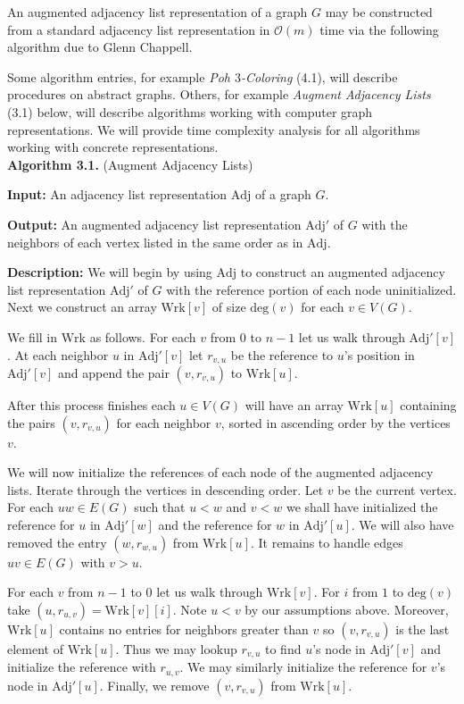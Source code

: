 \documentclass[letterpaper, 12pt]{article}
\theoremstyle{definition}
\theoremstyle{definition}
\theoremstyle{thm}
\theoremstyle{definition}
\begin{document}
An augmented adjacency list
representation of a graph $G$ may be constructed from a standard adjacency list
representation in $\mathcal{O}(m)$ time via the following algorithm due to 
Glenn Chappell.

Some algorithm entries, for example \textit{Poh $3$-Coloring} (4.1), will
describe procedures on abstract graphs. Others, for example
\textit{Augment Adjacency Lists} (3.1) below, will describe algorithms
working with computer graph representations. We will provide time complexity
analysis for all algorithms working with concrete representations.\\

\noindent\textbf{Algorithm 3.1.} (Augment Adjacency Lists)

\noindent\textbf{Input:} An adjacency list representation $\text{Adj}$ of a
graph $G$.

\noindent\textbf{Output:} An augmented adjacency list representation
$\text{Adj}'$ of $G$ with the neighbors of each vertex listed in the same order
as in $\text{Adj}$.

\noindent\textbf{Description:} We will begin by using $\text{Adj}$ to construct
an augmented adjacency list representation $\text{Adj}'$ of $G$ with the
reference portion of each node uninitialized.
Next we construct an array $\text{Wrk}[v]$ of size $\text{deg}(v)$ for each
$v\in V(G)$.

We fill in $\text{Wrk}$ as follows. For each $v$ from $0$ to $n-1$ let us walk
through $\text{Adj}'[v]$. At each neighbor $u$ in $\text{Adj}'[v]$ let
$r_{v,u}$ be the reference to $u$'s position in $\text{Adj}'[v]$ and append the
pair $(v,r_{v,u})$ to $\text{Wrk}[u]$.

After this process finishes each $u\in V(G)$ will have an array $\text{Wrk}[u]$
containing the pairs $(v,r_{v,u})$ for each neighbor $v$, sorted in ascending
order by the vertices $v$.

We will now initialize the references of each node of
the augmented adjacency lists.
Iterate through the vertices in descending order. Let $v$ be the current
vertex. For each 
$uw\in E(G)$ such that $u<w$ and $v<w$ we shall have initialized the reference
for $u$ in $\text{Adj}'[w]$ and the reference for $w$ in $\text{Adj}'[u]$. We
will also have removed the entry $(w,r_{w,u})$ from $\text{Wrk}[u]$. It remains
to handle edges $uv\in E(G)$ with $v>u$.

For each $v$ from $n-1$ to $0$ let us walk through $\text{Wrk}[v]$. For $i$ from
$1$ to $\text{deg}(v)$ take $(u,r_{u,v})=\text{Wrk}[v][i]$. Note $u<v$ by our
assumptions above. Moreover, $\text{Wrk}[u]$ contains no entries for neighbors
greater than $v$ so $(v,r_{v,u})$ is the last element of $\text{Wrk}[u]$. Thus
we may lookup $r_{v,u}$ to find $u$'s node in $\text{Adj}'[v]$ and initialize
the reference with $r_{u,v}$. We may similarly initialize the reference for
$v$'s node in $\text{Adj}'[u]$. Finally, we remove $(v,r_{v,u})$ from
$\text{Wrk}[u]$.
\end{document}

